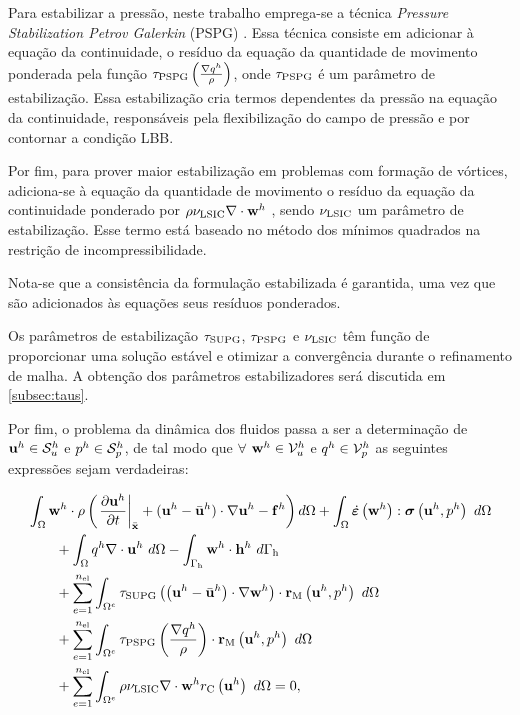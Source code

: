 \documentclass[tese_patricia]{subfiles}%
\begin{document}
Para estabilizar a pressão, neste trabalho emprega-se a técnica \textit{Pressure Stabilization Petrov Galerkin} (PSPG)   \cite{HughesFB:1986,TezduyarMRS:1992a}. Essa técnica consiste em adicionar à equação da continuidade, o resíduo da equação da quantidade de movimento ponderada pela função $\tau_{\mathrm{PSPG}} \left(\frac{\nabla q^h}{\rho}\right)$, onde $\tau_{\mathrm{PSPG}}$ é um parâmetro de estabilização. Essa estabilização cria termos dependentes da pressão na equação da continuidade, responsáveis pela flexibilização do campo de pressão e por contornar a condição LBB.

Por fim, para prover maior estabilização em problemas com formação de vórtices, adiciona-se à equação da quantidade de movimento o resíduo da equação da continuidade ponderado por $\rho \nu_{\mathrm{LSIC}} \nabla \cdot \mathbf{w}^h$ \cite{TezduyarO:2000}, sendo $\nu_{\mathrm{LSIC}}$ um parâmetro de estabilização. Esse termo está baseado no método dos mínimos quadrados na restrição de incompressibilidade. 

Nota-se que a consistência da formulação estabilizada é garantida, uma vez que são adicionados às equações seus resíduos ponderados.

Os parâmetros de estabilização $\tau_{\mathrm{SUPG}}$, $\tau_{\mathrm{PSPG}}$ e $\nu_{\mathrm{LSIC}}$ têm função de proporcionar uma solução estável e otimizar a convergência durante o refinamento de malha. A obtenção dos parâmetros estabilizadores será discutida em \ref{subsec:taus}. 

Por fim, o problema da dinâmica dos fluidos passa a ser a determinação de $\mathbf{u}^h \in \mathcal{S}_u^h$ e $p^h \in \mathcal{S}_p^h$, de tal modo que $\forall$ $\mathbf{w}^h \in \mathcal{V}_u^h$ e $q^h \in \mathcal{V}_p^h$ as seguintes expressões sejam verdadeiras:

\begin{align}
\begin{split}
&\int_{\domain} \utesth \cdot \density\left(\left.\frac{\partial\velocityh}{\partial t}\right|_{\posALE}+(\velocityh-\velocityALEh)\cdot \nabla\velocityh - \sbodyforce^h\right) d\domain +\int_{\domain} \strainratetensor \left(\utesth\right) : \stresstensor \left(\velocityh,\pressh\right)\ d\domain\\ &\qquad+ 
\int_{\domain}\ptesth \nabla \cdot \velocityh \ d\domain 
- \int_{\boundaryH}\utesth \cdot \straction^h\ d\boundaryH \\ 
&\qquad+ \sum_{e=1}^{\nel} \int_{\domainE} \SUPG \left(\left(\velocityh- \velocityALEh\right) \cdot \nabla\utesth\right) \cdot \resMom\left(\velocityh,\pressh \right)\  d\domain\\
&\qquad+ \sum_{e=1}^{\nel} \int_{\domainE} \PSPG \left(\frac{\nabla \ptesth}{\density}\right) \cdot \resMom\left(\velocityh,\pressh\right) \  d\domain\\
&\qquad+ \sum_{e=1}^{\nel} \int_{\domainE} \density \LSIC \nabla \cdot \utesth \resPre\left(\velocityh\right)\  d\domain = 0,
\label{eq:FinalSystem}
\end{split}
\end{align}
\end{document}
